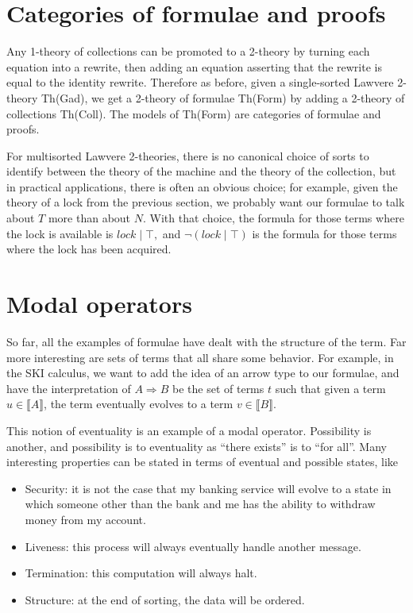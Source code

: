 \documentclass{article}
\newcommand{\interp}[1]{\llbracket #1 \rrbracket}
\newcommand{\lhom}{\Rightarrow}
\begin{document}
\section{Categories of formulae and proofs}

Any 1-theory of collections can be promoted to a 2-theory by turning each equation into a rewrite, then adding an equation asserting that the rewrite is equal to the identity rewrite.  Therefore as before, given a single-sorted Lawvere 2-theory Th(Gad), we get a 2-theory of formulae Th(Form) by adding a 2-theory of collections Th(Coll).  The models of Th(Form) are categories of formulae and proofs.

For multisorted Lawvere 2-theories, there is no canonical choice of sorts to identify between the theory of the machine and the theory of the collection, but in practical applications, there is often an obvious choice; for example, given the theory of a lock from the previous section, we probably want our formulae to talk about $T$ more than about $N$.  With that choice, the formula for those terms where the lock is available is $lock\;|\;\top,$ and $\neg(lock \;|\;\top)$ is the formula for those terms where the lock has been acquired.

\section{Modal operators}

So far, all the examples of formulae have dealt with the structure of the term.  Far more interesting are sets of terms that all share some behavior.  For example, in the SKI calculus, we want to add the idea of an arrow type to our formulae, and have the interpretation of $A \lhom B$ be the set of terms $t$ such that given a term $u\in\interp{A}$, the term eventually evolves to a term $v\in\interp{B}.$

This notion of eventuality is an example of a modal operator.  Possibility is another, and possibility is to eventuality as ``there exists'' is to ``for all''.  Many interesting properties can be stated in terms of eventual and possible states, like
\begin{itemize}
  \item Security: it is not the case that my banking service will evolve to a state in which someone other than the bank and me has the ability to withdraw money from my account.
  \item Liveness: this process will always eventually handle another message.
  \item Termination: this computation will always halt.
  \item Structure: at the end of sorting, the data will be ordered.
\end{itemize}
\end{document}
